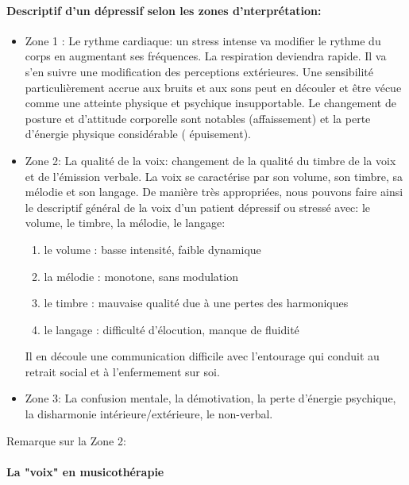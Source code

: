 \paragraph{Descriptif d'un dépressif selon les zones d'nterprétation:}



\begin{itemize}
  	\item Zone 1 :  Le rythme cardiaque: un stress intense va modifier le rythme
  du corps en augmentant ses fréquences. La respiration deviendra
  rapide. Il va s'en suivre une modification des perceptions
  extérieures. Une sensibilité particulièrement accrue aux bruits et
  aux sons peut en découler et être vécue comme une
  atteinte physique et psychique insupportable.
  Le changement de posture et d'attitude corporelle sont
notables (affaissement) et la perte d'énergie physique considérable ( épuisement).


 	\item Zone 2: La qualité de la voix: changement de la qualité du timbre de la
 voix et de l'émission verbale.
  La voix se caractérise par son volume, son timbre, sa mélodie et son langage. 
	De manière très appropriées, nous pouvons faire ainsi le
        descriptif général de la voix d'un patient dépressif ou
        stressé avec: le volume, le timbre, la
        mélodie, le langage: 
 	\begin{enumerate}
 		\item le volume : basse intensité, faible dynamique
 		\item la mélodie : monotone, sans modulation
 		\item le timbre : mauvaise qualité due à une pertes des harmoniques
 		\item le langage : difficulté d'élocution, manque de fluidité
 	\end{enumerate}
        Il en découle une communication difficile avec l'entourage qui  conduit au retrait social et à l'enfermement sur soi.
        
	\item Zone 3: La confusion mentale, la démotivation, la perte d'énergie
psychique, la disharmonie intérieure/extérieure, le non-verbal.
\end{itemize}

Remarque sur la Zone 2: \paragraph{La "voix" en musicothérapie}

